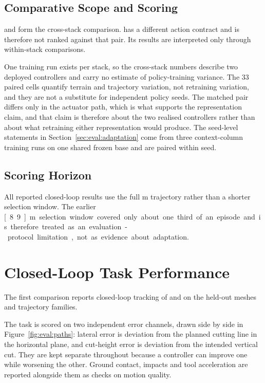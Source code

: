 \subsection{Comparative Scope and Scoring}
\label{sec:eval:standing}

\ppoROM{} and \ppoIDFD{} form the cross-stack comparison. \ppoAAMFD{} has a
different action contract and is therefore not ranked against that pair. Its
results are interpreted only through within-stack comparisons.

One training run exists per stack, so the cross-stack numbers describe two
deployed controllers and carry no estimate of policy-training variance. The
$33$ paired cells quantify terrain and trajectory variation, not retraining
variation, and they are not a substitute for independent policy seeds. The
matched pair differs only in the actuator path, which is what supports the
representation claim, and that claim is therefore about the two realised
controllers rather than about what retraining either representation would
produce. The seed-level statements in Section~\ref{sec:eval:adaptation} come
from three context-column training runs on one shared frozen base and are
paired within seed.

\subsection{Scoring Horizon}
\label{sec:eval:horizon}

All reported closed-loop results use the full \unit[26]{m} trajectory rather
than a shorter selection window. The earlier \unit[8.9]{m} selection window
covered only about one third of an episode and is therefore treated as an
evaluation-protocol limitation, not as evidence about adaptation.

\section{Closed-Loop Task Performance}
\label{sec:eval:tracking}

The first comparison reports closed-loop tracking of \ppoROM{} and \ppoIDFD{}
on the held-out meshes and trajectory families.

The task is scored on two independent error channels, drawn side by side in
Figure~\ref{fig:eval:paths}: lateral error is deviation from the planned
cutting line in the horizontal plane, and cut-height error is deviation from the
intended vertical cut. They are kept separate throughout because a controller
can improve one while worsening the other. Ground contact, impacts and tool
acceleration are reported alongside them as checks on motion quality.

